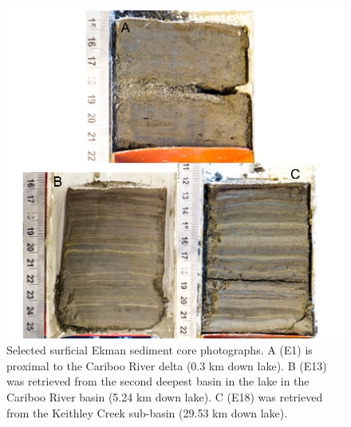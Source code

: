 \documentclass[Royal,times,doublespace,sageh]{sagej}
\begin{document}
\begin{figure}

{\centering \includegraphics[width=1\linewidth]{figs/ekman_example} 

}

\caption{Selected surficial Ekman sediment core photographs. A (E1) is proximal to the Cariboo River delta (0.3 km down lake). B (E13) was retrieved from the second deepest basin in the lake in the Cariboo River basin (5.24 km down lake). C (E18) was retrieved from the Keithley Creek sub-basin (29.53 km down lake).}\label{fig:ekmanImgs}
\end{figure}
\end{document}
